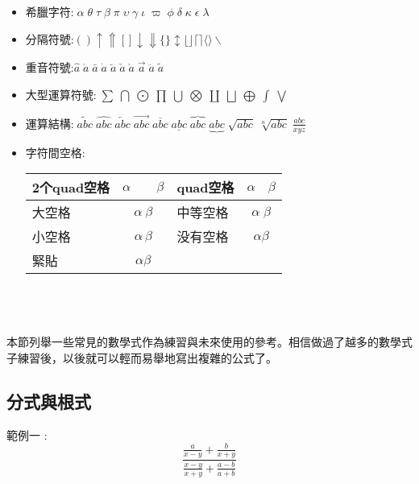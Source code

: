 \begin{itemize}
\item 希臘字符:$ \;\alpha \;\theta \;\tau \;\beta \;\pi  \;\upsilon \;\gamma  \;\iota \;\varpi \;\phi \;\delta  \;\kappa \;\epsilon  \;\lambda $ 
\item 分隔符號:$ ( )  \uparrow  \Uparrow [  ] \downarrow  \Downarrow \{  \}  \updownarrow \lfloor  \rfloor  \lceil \rceil \langle \rangle \backslash$
\item 重音符號:$\hat{a}  \;\acute{a}  \;\bar{a}  \;\dot{a}  \;\breve{a} \;\check{a}  \;\grave{a} \;\vec{a}  \;\ddot{a} \;\tilde{a}$
\item 大型運算符號:$\;\sum \;\bigcap \;\bigodot \;\prod \;\bigcup \;\bigotimes \;\coprod \;\bigsqcup  \;\bigoplus \;\int \;\bigvee$
\item 運算結構:$\;\widetilde{abc} \;\widehat{abc} \;\overleftarrow{abc} \;\overrightarrow{abc} \;\overline{abc} \;\underline{abc}\;\overbrace{abc} \;\underbrace{abc} \;\sqrt{abc} \;\sqrt[n]{abc} \;\frac{abc}{xyz}$
\item 字符間空格:
\begin{center} 
\begin{tabular}{|l|c|l|c|}%
\hline  %
  2个quad空格  & $\alpha\qquad\beta$  & quad空格	&$\alpha\quad\beta$	\\\hline  %
  大空格	      & $\alpha\ \beta$	      & 中等空格 & $\alpha\;\beta	$		\\\hline
  小空格       & $\alpha\,\beta	$     & 没有空格	& $\alpha\beta$  \\\hline
  緊貼         & $\alpha\!\beta	$     &         &                  \\\hline
\end{tabular}\\
\end{center}
\end{itemize}


\section{}
本節列舉一些常見的數學式作為練習與未來使用的參考。相信做過了越多的數學式子練習後，以後就可以輕而易舉地寫出複雜的公式了。

\subsection{分式與根式}
範例一 :
$$
\frac{\frac{\displaystyle a}{\displaystyle x-y}+
\frac{\displaystyle b}{\displaystyle x+y}}
{\frac{\displaystyle x-y}{\displaystyle x+y}+
\frac{\displaystyle a-b}{\displaystyle a+b}}
$$


